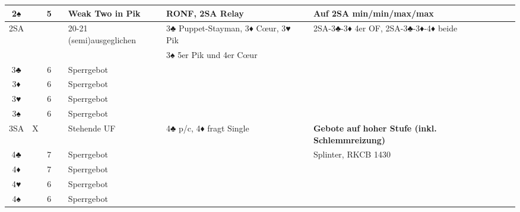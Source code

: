\documentclass{article}
\begin{document}
\begin{tabularx}{\columnwidth}{|c|c|c|c|l|l|X|l|}
\hline 2♠  & &5& & Weak Two in Pik & RONF, 2SA Relay & Auf 2SA min/min/max/max & \\
\hline 2SA & & & & 20-21 (semi)ausgeglichen & 3♣ Puppet-Stayman, 3♦ C\oe{}ur, 3♥ Pik  & 2SA-3♣-3♦ 4er OF, 2SA-3♣-3♦-4♦ beide & \\
           & & & & & 3♠ 5er Pik und 4er Cœur & & \\
\hline 3♣  & &6& & Sperrgebot & & & \\
\hline 3♦  & &6& & Sperrgebot & & & \\
\hline 3♥  & &6& & Sperrgebot & & & \\
\hline 3♠  & &6& & Sperrgebot & & & \\
\hline 3SA &X& & & Stehende UF & 4♣ p/c, 4♦ fragt Single & \multicolumn{2}{l|}{\bf Gebote auf hoher Stufe (inkl. Schlemmreizung)} \\
\hline 4♣  & &7& & Sperrgebot & & \multicolumn{2}{l|}{Splinter, RKCB 1430} \\
\hline 4♦  & &7& & Sperrgebot & & \multicolumn{2}{l|}{} \\
\hline 4♥  & &6& & Sperrgebot & & \multicolumn{2}{l|}{} \\
\hline 4♠  & &6& & Sperrgebot & & \multicolumn{2}{l|}{} \\
\hline \end{tabularx}
\end{document}
